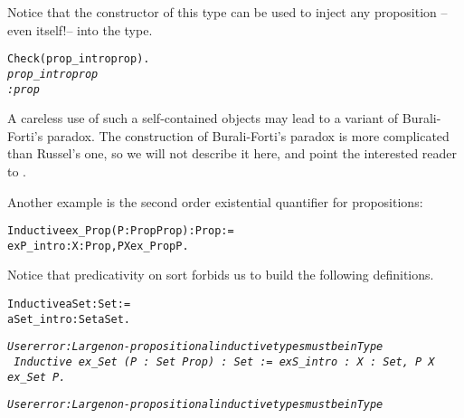 \documentclass[11pt]{article}
\begin{document}
Notice
that the constructor of this type can be used to inject any
proposition --even itself!-- into the type. 

\begin{alltt}
Check (prop_intro prop).\it
prop_intro prop
     : prop
\end{alltt}

A careless use of such a
self-contained objects may lead to a variant of Burali-Forti's
paradox. The construction of Burali-Forti's paradox is more
complicated than Russel's one, so we will not describe it here, and
point the interested reader to \cite{Bar98,Coq86}.


Another example is the second order existential quantifier for propositions:

\begin{alltt}
Inductive ex_Prop  (P : Prop {\arrow} Prop) : Prop :=
  exP_intro : {\prodsym} X : Prop, P X {\arrow} ex_Prop P.
\end{alltt}







Notice that predicativity on sort  forbids us to build
the following definitions.


\begin{alltt}
Inductive aSet : Set :=
  aSet_intro: Set {\arrow} aSet.

\it{}User error: Large non-propositional inductive types must be in Type
\tt 
Inductive ex_Set  (P : Set {\arrow} Prop) : Set :=
  exS_intro : {\prodsym} X : Set, P X {\arrow} ex_Set P.

\it{}User error: Large non-propositional inductive types must be in Type
\end{alltt}
\end{document}

